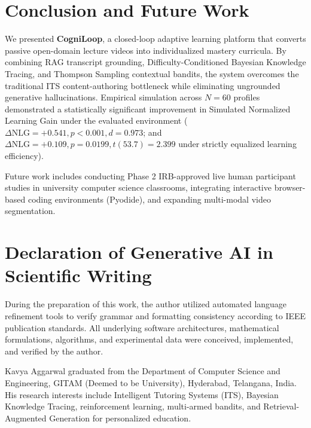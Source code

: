 \documentclass[journal]{IEEEtran}
\begin{document}
%
%
\section{Conclusion and Future Work}
We presented \textbf{CogniLoop}, a closed-loop adaptive learning platform that converts passive open-domain lecture videos into individualized mastery curricula. By combining RAG transcript grounding, Difficulty-Conditioned Bayesian Knowledge Tracing, and Thompson Sampling contextual bandits, the system overcomes the traditional ITS content-authoring bottleneck while eliminating ungrounded generative hallucinations. Empirical simulation across $N=60$ profiles demonstrated a statistically significant improvement in Simulated Normalized Learning Gain under the evaluated environment ($\Delta \text{NLG} = +0.541, p < 0.001, d = 0.973$; and $\Delta \text{NLG} = +0.109, p = 0.0199, t(53.7) = 2.399$ under strictly equalized learning efficiency).

Future work includes conducting Phase 2 IRB-approved live human participant studies in university computer science classrooms, integrating interactive browser-based coding environments (Pyodide), and expanding multi-modal video segmentation.

%
%
\section*{Declaration of Generative AI in Scientific Writing}
During the preparation of this work, the author utilized automated language refinement tools to verify grammar and formatting consistency according to IEEE publication standards. All underlying software architectures, mathematical formulations, algorithms, and experimental data were conceived, implemented, and verified by the author.

%
%



%
%
\begin{IEEEbiographynophoto}{Kavya Aggarwal}
graduated from the Department of Computer Science and Engineering, GITAM (Deemed to be University), Hyderabad, Telangana, India. His research interests include Intelligent Tutoring Systems (ITS), Bayesian Knowledge Tracing, reinforcement learning, multi-armed bandits, and Retrieval-Augmented Generation for personalized education.
\end{IEEEbiographynophoto}
\end{document}
